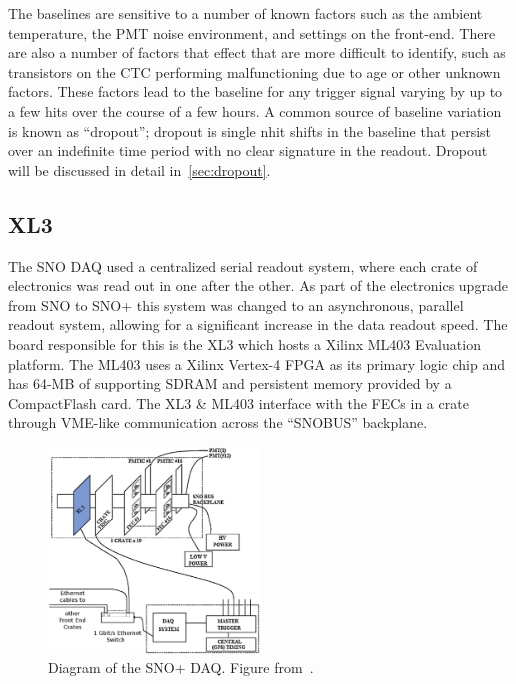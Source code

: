The baselines are sensitive to a number of known factors such as the
ambient temperature, the PMT noise environment, and settings
on the front-end.
There are also a number of factors that effect that are more difficult
to identify, such as transistors on the CTC performing malfunctioning due to
age or other unknown factors.
These factors lead to the baseline for any trigger signal varying
by up to a few hits over the course of a few hours.
A common source of baseline variation is known as ``dropout'';
dropout is single nhit shifts in the  baseline that persist over an indefinite
time period with no clear signature in the readout.
Dropout will be discussed in detail in~\ref{sec:dropout}.

\subsection{XL3}
\label{sec:xl3}
The SNO DAQ used a centralized serial readout system, where each crate of
electronics was read out in one after the other.
As part of the electronics upgrade from SNO to SNO+ this system was changed to
an asynchronous, parallel readout system, allowing for a significant increase in
the data readout speed.
The board responsible for this is the XL3 which hosts a Xilinx ML403
Evaluation platform.
The ML403 uses a Xilinx Vertex-4 FPGA as its primary logic chip and has
64-MB of supporting SDRAM and persistent memory provided by a CompactFlash
card.
The XL3 \& ML403 interface with the FECs in a crate through VME-like communication
across the ``SNOBUS'' backplane.

\begin{figure}[htbp]
    \centering
    \includegraphics[width=0.5\textwidth]{xl3_daq_diagram}
    \caption[SNO+ DAQ Diagram]{Diagram of the SNO+ DAQ\@.
    Figure from~\citep{richie_thesis}.}
\label{fig:xl3_daq_diagram}
\end{figure}

